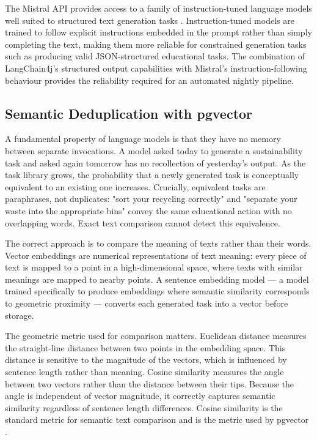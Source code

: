 The Mistral API provides access to a family of instruction-tuned language models well suited to structured text generation tasks \cite{mistral2024}. Instruction-tuned models are trained to follow explicit instructions embedded in the prompt rather than simply completing the text, making them more reliable for constrained generation tasks such as producing valid JSON-structured educational tasks. The combination of LangChain4j's structured output capabilities with Mistral's instruction-following behaviour provides the reliability required for an automated nightly pipeline.

\subsection{Semantic Deduplication with pgvector}

A fundamental property of language models is that they have no memory between separate invocations. A model asked today to generate a sustainability task and asked again tomorrow has no recollection of yesterday's output. As the task library grows, the probability that a newly generated task is conceptually equivalent to an existing one increases. Crucially, equivalent tasks are paraphrases, not duplicates: "sort your recycling correctly" and "separate your waste into the appropriate bins" convey the same educational action with no overlapping words. Exact text comparison cannot detect this equivalence.

The correct approach is to compare the meaning of texts rather than their words. Vector embeddings are numerical representations of text meaning: every piece of text is mapped to a point in a high-dimensional space, where texts with similar meanings are mapped to nearby points. A sentence embedding model --- a model trained specifically to produce embeddings where semantic similarity corresponds to geometric proximity --- converts each generated task into a vector before storage.

The geometric metric used for comparison matters. Euclidean distance measures the straight-line distance between two points in the embedding space. This distance is sensitive to the magnitude of the vectors, which is influenced by sentence length rather than meaning. Cosine similarity measures the angle between two vectors rather than the distance between their tips. Because the angle is independent of vector magnitude, it correctly captures semantic similarity regardless of sentence length differences. Cosine similarity is the standard metric for semantic text comparison and is the metric used by pgvector \cite{pgvector2024}.

